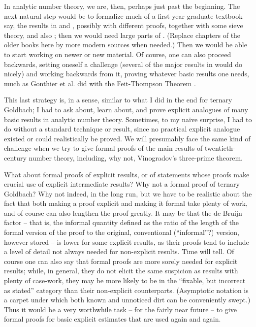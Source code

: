 In analytic number theory, we are, then, perhaps just past the beginning.
The next natural step would be to formalize much of a first-year graduate
textbook -- say, the results in \cite{MR0217022} and \cite{MR2378655},
possibly with different
proofs, together with some sieve theory, and also \cite{zbMATH03968684};
then we would need large parts of \cite{MR2061214}.
(Replace chapters of the older books here by more modern sources when needed.) Then we would be able to
start working on newer or new material. Of course, one can also proceed
backwards, setting oneself a challenge (several of the major results in
\cite{MR2061214} would do nicely) and working backwards from it,
proving whatever basic results one needs, much as
Gonthier et al. did with the Feit-Thompson Theorem \cite{Gonthieretal2013a}.

This last strategy is, in a sense, similar to what I did in the end for
ternary Goldbach; I had to ask about, learn about, and prove explicit
analogues of many basic results in analytic number theory. Sometimes, to my
na\"ive surprise, I had to do without a standard technique or result, since
no practical explicit analogue existed or could realistically be proved.
We will presumably face the same kind of challenge when we try to give 
formal proofs of the main results of twentieth-century number theory,
including, why not, Vinogradov's three-prime theorem.

What about formal proofs of explicit results, or of statements whose proofs
make crucial use of explicit intermediate results? Why not a formal proof of
ternary Goldbach? Why not indeed, in the long run, but we have to be realistic
about the fact that both making a proof explicit and making it formal take
plenty of work, and of course can also lengthen the proof greatly. It may be
that the de Bruijn factor -- that is, the informal quantity defined as the
ratio of the length of the formal version of the proof to the original, conventional (``informal''?) version, however stored -- is lower for some explicit results, as their proofs tend to
include a level of detail not always needed for non-explicit results. Time will
tell. Of course one can also say that formal proofs are more sorely needed
for explicit results; while, in general,
they do not elicit the same suspicion as results with plenty of case-work,
they may be more likely to be in the ``fixable, but incorrect as stated''
category than their non-explicit counterparts. (Asymptotic notation is
a carpet under which both known and unnoticed dirt can be conveniently swept.)
Thus it would be a very worthwhile task -- for the fairly near future --
to give formal proofs for basic explicit
estimates that are used again and again.

